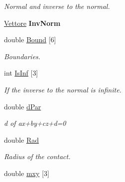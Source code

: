 \begin{DoxyCompactItemize}
\begin{DoxyCompactList}\small\item\em \-Normal and inverse to the normal. \end{DoxyCompactList}\item 
\hypertarget{classPiano_aa4d08f1fb27cc9a543a1284307a7056e}{\hyperlink{classVettore}{\-Vettore} {\bfseries \-Inv\-Norm}}\label{classPiano_aa4d08f1fb27cc9a543a1284307a7056e}

\item 
\hypertarget{classPiano_a0f41faab69f9c65dfd0fb1be94a39e98}{double \hyperlink{classPiano_a0f41faab69f9c65dfd0fb1be94a39e98}{\-Bound} \mbox{[}6\mbox{]}}\label{classPiano_a0f41faab69f9c65dfd0fb1be94a39e98}

\begin{DoxyCompactList}\small\item\em \-Boundaries. \end{DoxyCompactList}\item 
\hypertarget{classPiano_a1674748957dda21006ad123fdd340ae5}{int \hyperlink{classPiano_a1674748957dda21006ad123fdd340ae5}{\-Is\-Inf} \mbox{[}3\mbox{]}}\label{classPiano_a1674748957dda21006ad123fdd340ae5}

\begin{DoxyCompactList}\small\item\em \-If the inverse to the normal is infinite. \end{DoxyCompactList}\item 
\hypertarget{classPiano_a572f508f165c489a801e9952b2147404}{double \hyperlink{classPiano_a572f508f165c489a801e9952b2147404}{d\-Par}}\label{classPiano_a572f508f165c489a801e9952b2147404}

\begin{DoxyCompactList}\small\item\em d of ax+by+cz+d=0 \end{DoxyCompactList}\item 
\hypertarget{classPiano_a860bef50013f57ab1a6437b7986a9487}{double \hyperlink{classPiano_a860bef50013f57ab1a6437b7986a9487}{\-Rad}}\label{classPiano_a860bef50013f57ab1a6437b7986a9487}

\begin{DoxyCompactList}\small\item\em \-Radius of the contact. \end{DoxyCompactList}\item 
\hypertarget{classPiano_adad63c5605eb5e3c78e5a256458a6db9}{double \hyperlink{classPiano_adad63c5605eb5e3c78e5a256458a6db9}{mxy} \mbox{[}3\mbox{]}}\label{classPiano_adad63c5605eb5e3c78e5a256458a6db9}


\end{DoxyCompactItemize}
